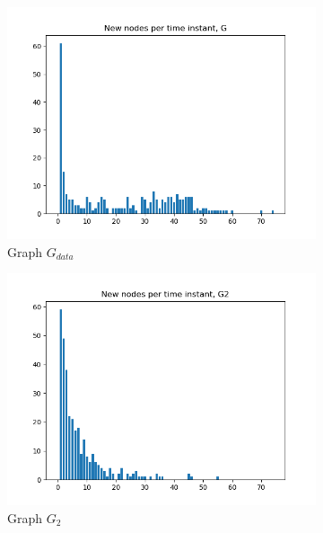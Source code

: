 \documentclass[letterpaper]{article}
\begin{document}
\begin{figure}
    \centering
    \begin{subfigure}[b]{0.32\textwidth}
        \includegraphics[width=\textwidth]{img/newNodesG.png}
        \caption{Graph \(G_{data}\)}
	    \label{fig:degree_distribution_G}
    \end{subfigure}
    \begin{subfigure}[b]{0.32\textwidth}
        \includegraphics[width=\textwidth]{img/newNodesG2.png}
        \caption{Graph \(G_2\)}
	    \label{fig:degree_distribution_G2}
    \end{subfigure}
    \begin{subfigure}[b]{0.32\textwidth}

\end{subfigure}
\end{figure}
\end{document}
